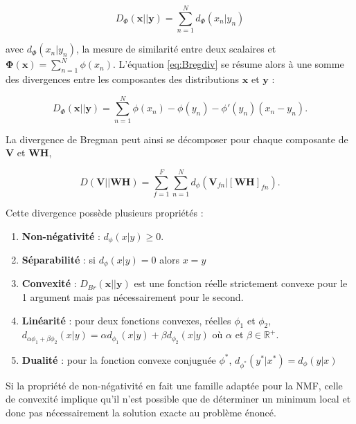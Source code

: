 \begin{equation}
D_{\Phi}(\mathbf{x}\vert\vert \mathbf{y}) = \sum_{n=1}^N d_{\Phi}(x_n\vert y_n)
\end{equation}

avec $d_{\Phi}(x_n\vert y_n)$, la mesure de similarité entre deux scalaires et $\mathbf{\Phi(x)} = \sum_{n=1}^N \phi(x_n)$. L'équation \ref{eq:Bregdiv} se résume alors à une somme des divergences entre les composantes des distributions $\mathbf{x}$ et $\mathbf{y}$ :

\begin{equation}\label{eq:divBregWise}
D_{\Phi}(\textbf{x}\vert\vert \textbf{y}) = \sum_{n=1}^N \phi(x_n)-\phi(y_n)-\phi'(y_n)(x_n-y_n).
\end{equation}

La divergence de Bregman peut ainsi se décomposer pour chaque composante de $\mathbf{V}$ et $\mathbf{WH}$, 

\begin{equation}\label{eq:similarite2}
D\left(\textbf{V} \vert\vert \textbf{WH} \right) = \sum_{f = 1}^{F} \sum_{n = 1}^{N} d_{\phi}
\left(\textbf{V}_{fn} \vert \left[ \textbf{WH} \right]_{fn} \right).
\end{equation}


Cette divergence possède plusieurs propriétés : 

\begin{enumerate}
\item \textbf{Non-négativité} : $d_{\phi}(x\vert y) \geq 0$.

\item \textbf{Séparabilité} : si $d_{\phi}(x\vert y) = 0$ alors $x = y$

\item \textbf{Convexité} : $D_{Br}(\textbf{x}\vert\vert \textbf{y})$ est une fonction réelle strictement convexe pour le 1\ier{} argument mais pas nécessairement pour le second.

\item \textbf{Linéarité} : pour deux fonctions convexes, réelles $\phi_1$ et $\phi_2$,  $d_{\alpha \phi_1 + \beta \phi_2}(x\vert y) = \alpha d_{\phi_1}(x\vert y)+\beta d_{\phi_2}(x\vert y)$ où $\alpha$ et $\beta \in \mathbb{R}^+$.

\item \textbf{Dualité} : pour la fonction convexe conjuguée $\phi^{\ast}$, $d_{\phi^{\ast}}(y^{\ast}\vert x^{\ast}) = d_{\phi}(y \vert x)$
\end{enumerate}

Si la propriété de non-négativité en fait une famille adaptée pour la NMF, celle de convexité implique qu'il n'est possible que de déterminer un minimum local et donc pas nécessairement la solution exacte au problème énoncé.


